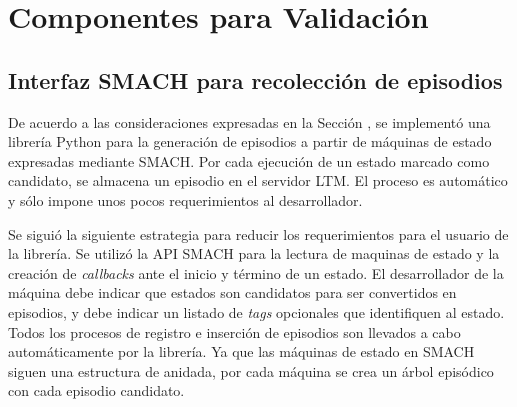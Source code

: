 
\section{Componentes para Validación}




\subsection{Interfaz SMACH para recolección de episodios}

De acuerdo a las consideraciones expresadas en la Sección \label{sec:design_bender}, se implementó una librería Python para la generación de episodios a partir de máquinas de estado expresadas mediante SMACH. Por cada ejecución de un estado marcado como candidato, se almacena un episodio en el servidor LTM. El proceso es automático y sólo impone unos pocos requerimientos al desarrollador.

 Se siguió la siguiente estrategia para reducir los requerimientos para el usuario de la librería. Se utilizó la API SMACH para la lectura de maquinas de estado y la creación de \textit{callbacks} ante el inicio y término de un estado. El desarrollador de la máquina debe indicar que estados son candidatos para ser convertidos en episodios, y debe indicar un listado de \textit{tags} opcionales que identifiquen al estado. Todos los procesos de registro e inserción de episodios son llevados a cabo automáticamente por la librería. Ya que las máquinas de estado en SMACH siguen una estructura de anidada, por cada máquina se crea un árbol episódico con cada episodio candidato.

